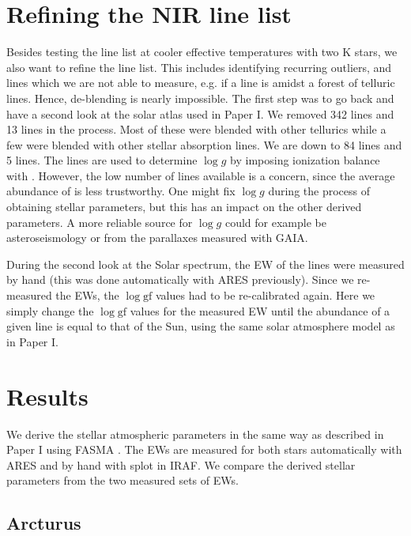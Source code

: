 \documentclass{aa}
\begin{document}
\section{Refining the NIR line list}
\label{sec:refining_the_line_list}

Besides testing the line list at cooler effective temperatures with two K stars,
we also want to refine the line list. This includes identifying recurring
outliers, and lines which we are not able to measure, e.g. if a line is amidst a
forest of telluric lines. Hence, de-blending is nearly impossible. The first
step was to go back and have a second look at the solar atlas used in
Paper I. We removed 342  lines and 13 
lines in the process. Most of these were blended with other tellurics while a
few were blended with other stellar absorption lines. We are down to 84
 lines and 5  lines. The  lines are used to
determine $\log g$ by imposing ionization balance with . However, the
low number of  lines available is a concern, since the average
abundance of  is less trustworthy. One might fix $\log g$ during the
process of obtaining stellar parameters, but this has an impact on the other
derived parameters. A more reliable source for $\log g$ could for example be
asteroseismology or from the parallaxes measured with GAIA.

During the second look at the Solar spectrum, the EW of the lines were measured
by hand (this was done automatically with ARES previously). Since we re-measured
the EWs, the $\log \mathrm{gf}$ values had to be re-calibrated again. Here we
simply change the $\log \mathrm{gf}$ values for the measured EW until the
abundance of a given line is equal to that of the Sun, using the same solar
atmosphere model as in Paper I.


\section{Results}
\label{sec:results}

We derive the stellar atmospheric parameters in the same way as described in
Paper I using FASMA \citep{Andreasen2017a}. The EWs are measured
for both stars automatically with ARES \citep{Sousa2015a} and by hand with splot
in IRAF. We compare the derived stellar parameters from the two measured sets of
EWs.


\subsection{Arcturus}
\label{sec:arcturus}
\end{document}
